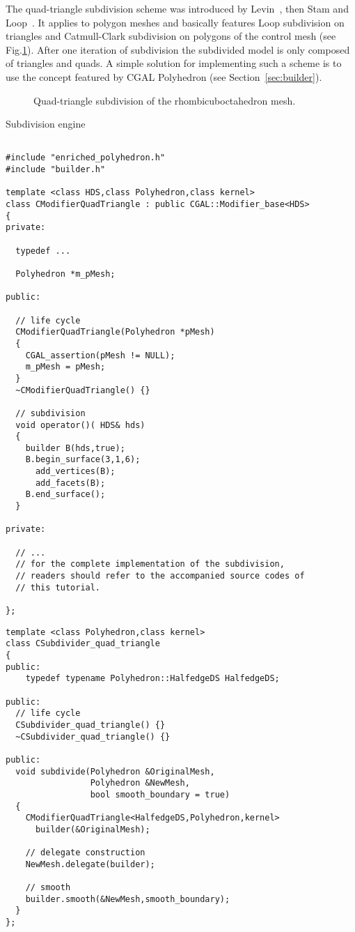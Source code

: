 
The quad-triangle subdivision scheme was introduced by
Levin~\cite{l-pg-03}, then Stam and Loop~\cite{sl-qts-02}. It applies
to polygon meshes and basically features Loop subdivision on triangles
and Catmull-Clark subdivision on polygons of the control mesh (see
Fig.\ref{fig:quad-triangle}). After one iteration of subdivision the
subdivided model is only composed of triangles and quads. A simple
solution for implementing such a scheme is to use the
 concept featured by CGAL 
Polyhedron (see Section~\ref{sec:builder}).



\begin{figure}[htb]
    \caption{Quad-triangle subdivision of the rhombicuboctahedron mesh.}
    \label{fig:quad-triangle}
\end{figure}

Subdivision engine

{ \scriptsize
\begin{verbatim}

#include "enriched_polyhedron.h"
#include "builder.h"

template <class HDS,class Polyhedron,class kernel>
class CModifierQuadTriangle : public CGAL::Modifier_base<HDS>
{
private:

  typedef ...

  Polyhedron *m_pMesh;

public:

  // life cycle
  CModifierQuadTriangle(Polyhedron *pMesh)
  {
    CGAL_assertion(pMesh != NULL);
    m_pMesh = pMesh;
  }
  ~CModifierQuadTriangle() {}

  // subdivision
  void operator()( HDS& hds)
  {
    builder B(hds,true);
    B.begin_surface(3,1,6);
      add_vertices(B);
      add_facets(B);
    B.end_surface();
  }

private:

  // ... 
  // for the complete implementation of the subdivision, 
  // readers should refer to the accompanied source codes of 
  // this tutorial.
  
};
\end{verbatim}}

{ \scriptsize
\begin{verbatim}
template <class Polyhedron,class kernel>
class CSubdivider_quad_triangle
{
public:
    typedef typename Polyhedron::HalfedgeDS HalfedgeDS;

public:
  // life cycle
  CSubdivider_quad_triangle() {}
  ~CSubdivider_quad_triangle() {}

public:
  void subdivide(Polyhedron &OriginalMesh,
                 Polyhedron &NewMesh,
                 bool smooth_boundary = true)
  {
    CModifierQuadTriangle<HalfedgeDS,Polyhedron,kernel> 
      builder(&OriginalMesh);

    // delegate construction 
    NewMesh.delegate(builder);

    // smooth
    builder.smooth(&NewMesh,smooth_boundary);
  }
};
\end{verbatim}}
